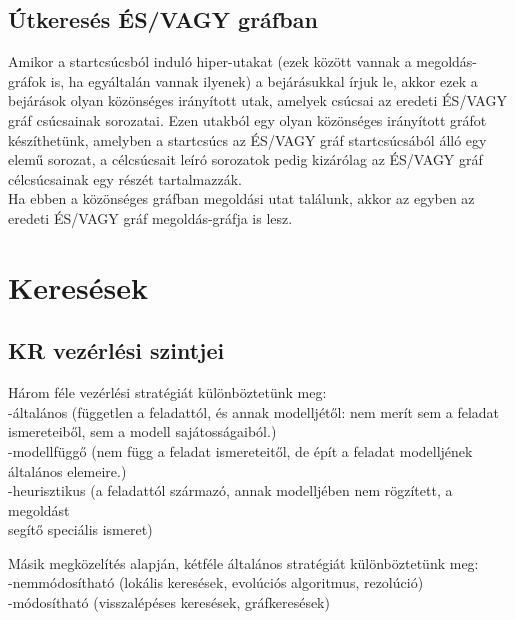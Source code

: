 \documentclass{article}
\begin{document}
	 \subsection{Útkeresés ÉS/VAGY gráfban}
	 Amikor a startcsúcsból induló hiper-utakat (ezek között vannak a megoldás-gráfok is, ha egyáltalán vannak ilyenek) a bejárásukkal írjuk le, akkor ezek a bejárások olyan közönséges irányított utak, amelyek csúcsai az eredeti ÉS/VAGY gráf csúcsainak sorozatai. Ezen utakból egy olyan közönséges irányított gráfot készíthetünk, amelyben a startcsúcs az ÉS/VAGY gráf startcsúcsából álló egy elemű sorozat, a célcsúcsait leíró sorozatok pedig kizárólag az ÉS/VAGY gráf célcsúcsainak egy részét tartalmazzák.\\
	 Ha ebben a közönséges gráfban megoldási utat találunk, akkor az egyben az eredeti ÉS/VAGY gráf megoldás-gráfja is lesz.
	 
	 
	 \section{Keresések}
	 
	 \subsection{KR vezérlési szintjei}
	 Három féle vezérlési stratégiát különböztetünk meg:\\
	 -általános (független a feladattól, és annak modelljétől: nem merít sem a feladat\\ \hspace*{0,2em}ismereteiből, sem a modell sajátosságaiból.)\\
	 -modellfüggő (nem függ a feladat ismereteitől, de épít a feladat modelljének\\
	 \hspace*{0,2em} általános elemeire.)\\
	 -heurisztikus (a feladattól származó, annak modelljében nem rögzített, a megoldást\\
	 \hspace*{0,2em} segítő speciális ismeret)
	 
	 Másik megközelítés alapján, kétféle általános stratégiát különböztetünk meg:\\
	 -nemmódosítható (lokális keresések, evolúciós algoritmus, rezolúció)\\
	 -módosítható (visszalépéses keresések, gráfkeresések)
	 
\end{document}
